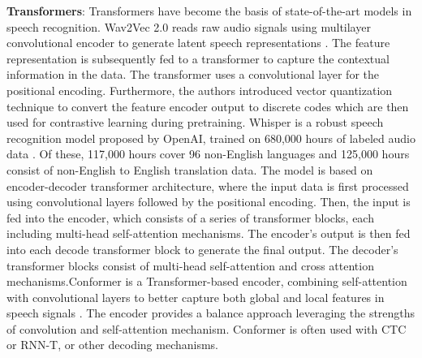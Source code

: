 \documentclass[preprint,12pt]{elsarticle}
\begin{document}
\textbf{Transformers}: Transformers have become the basis of state-of-the-art models in speech recognition. Wav2Vec 2.0 reads raw audio signals using multilayer convolutional encoder to generate latent speech representations \citep{baevski_wav2vec_2020}. The feature representation is subsequently fed to a transformer to capture the contextual information in the data. The transformer uses a convolutional layer for the positional encoding. Furthermore, the authors introduced vector quantization technique to convert the feature encoder output to discrete codes which are then used for contrastive learning during pretraining. Whisper is a robust speech recognition model proposed by OpenAI, trained on 680,000 hours of labeled audio data \citep{radford_robust_2022}. Of these, 117,000 hours cover 96 non-English languages and 125,000 hours consist of non-English to English translation data. The model is based on encoder-decoder transformer architecture, where the input data is first processed using convolutional layers followed by the positional encoding. Then, the input is fed into the encoder, which consists of a series of transformer blocks, each including multi-head self-attention mechanisms. The encoder's output is then fed into each decode transformer block to generate the final output. The decoder's transformer blocks consist of multi-head self-attention and cross attention mechanisms.Conformer is a Transformer-based encoder, combining self-attention with convolutional layers to better capture both global and local features in speech signals \cite{gulati_conformer_2020}. The encoder provides a balance approach leveraging the strengths of convolution and self-attention mechanism. Conformer is often used with CTC or RNN-T, or other decoding mechanisms.
\end{document}
